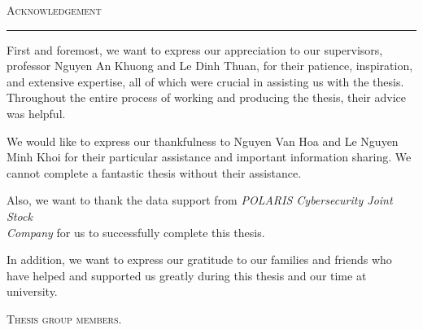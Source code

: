 \thispagestyle{empty}
\vspace*{3cm}
\noindent\Huge\textsc{Acknowledgement}\\
\normalsize
\noindent\rule[2pt]{\textwidth}{0.8pt}
\hspace*{5cm}
 
First and foremost, we want to express our appreciation to our supervisors, professor Nguyen An Khuong and Le Dinh Thuan, for their patience, inspiration, and extensive expertise, all of which were crucial in assisting us with the thesis. Throughout the entire process of working and producing the thesis, their advice was helpful.

We would like to express our thankfulness to Nguyen Van Hoa and Le Nguyen Minh Khoi for their particular assistance and important information sharing. We cannot complete a fantastic thesis without their assistance.

Also, we want to thank the data support from \textit{POLARIS Cybersecurity Joint Stock \\Company} for us to successfully complete this thesis.

In addition, we want to express our gratitude to our families and friends who have helped and supported us greatly during this thesis and our time at university.
	
	\hfill \textsc{Thesis group members.}
	
\cleardoublepage
